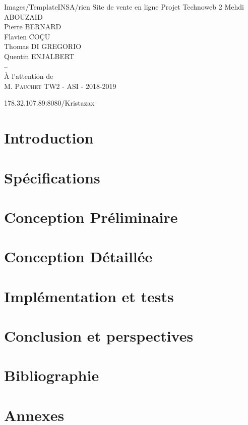 \documentclass[12pt,a4paper]{article}
\begin{document}
\PageDeGarde
{Images/TemplateINSA/rien} %
{Site de vente en ligne} %
{Projet Technoweb 2} %
{Mehdi ABOUZAID\\
 Pierre BERNARD\\
 Flavien COÇU\\
 Thomas DI GREGORIO\\
 Quentin ENJALBERT\\
 --\\
 À l'attention de \\ M. \textsc{Pauchet}} %
{TW2 - ASI - 2018-2019} %


\newpage
\tableofcontents


178.32.107.89:8080/Kristazax
\newpage
\section{Introduction}


\newpage
\section{Spécifications}


\newpage
\section{Conception Préliminaire}


\newpage
\section{Conception Détaillée}


\newpage
\section{Implémentation et tests}


\newpage
\section{Conclusion et perspectives}


\newpage
\section{Bibliographie}


\newpage
\section{Annexes}

\end{document}
